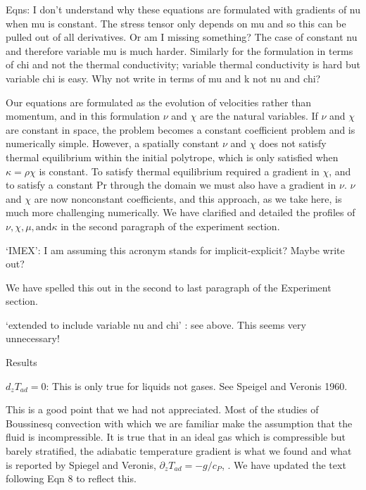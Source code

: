 \documentclass[aps, 11pt, singlecolumn]{revtex4-1} %
\begin{document}
\begin{singlespace}
\begin{myquotation}
Eqns: I don't understand why these equations are formulated with
gradients of nu when mu is constant. The stress tensor only depends on
mu and so this can be pulled out of all derivatives. Or am I missing
something? The case of constant nu and therefore variable mu is much
harder. Similarly for the formulation in terms of chi and not the
thermal conductivity; variable thermal conductivity is hard but
variable chi is easy. Why not write in terms of mu and k not nu and
chi?
\end{myquotation}
Our equations are formulated as the evolution of velocities rather
than momentum, and in this formulation $\nu$ and $\chi$ are the
natural variables.  If $\nu$ and $\chi$ are constant in space,
the problem becomes a constant coefficient problem and is numerically
simple.  However, a spatially constant $\nu$ and $\chi$ does not satisfy
thermal equilibrium within the initial polytrope, which is only satisfied when
$\kappa = \rho\chi$ is constant.  To satisfy thermal equilibrium required
a gradient in $\chi$, and to satisfy a constant Pr through the domain we
must also have a gradient in $\nu$.  $\nu$ and $\chi$ are now nonconstant
coefficients, and this approach, as we take here, is much more challenging numerically. 
 We have
clarified and detailed the profiles of $\nu, \chi, \mu, \text{and} \kappa$
in the second paragraph of the experiment section.

\begin{myquotation}
`IMEX': I am assuming this acronym stands for implicit-explicit?
Maybe write out?
\end{myquotation}
We have spelled this out in the second to last paragraph of the Experiment section.

\begin{myquotation}
`extended to include variable nu and chi' : see above. This seems
very unnecessary!

Results

$d_z T_{ad} = 0$: This is only true for liquids not gases. See Speigel and
Veronis 1960.
\end{myquotation}
This is a good point that we had not appreciated.  Most of the studies of Boussinesq
convection with which we are familiar make the assumption that the fluid is incompressible.
It is true that in an ideal gas which is compressible but barely stratified, the
adiabatic temperature gradient is what we found and what is reported by
Spiegel and Veronis, $\partial_z T_{ad} = -g/c_P$, \cite{spiegel&veronis1960}.
We have updated the text following Eqn 8 to reflect this.


\end{singlespace}
\end{document}
